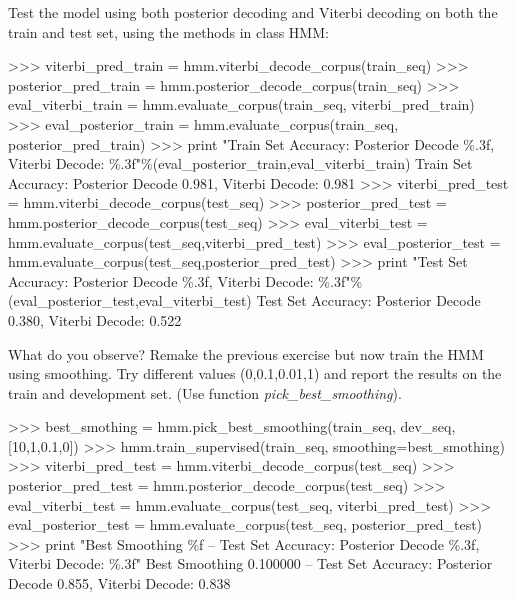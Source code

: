 \begin{exercise}
Test the model using both posterior decoding and Viterbi decoding on
both the train and test set, using the methods in class HMM:
\begin{python}
>>> viterbi_pred_train = hmm.viterbi_decode_corpus(train_seq)
>>> posterior_pred_train = hmm.posterior_decode_corpus(train_seq)
>>> eval_viterbi_train =   hmm.evaluate_corpus(train_seq, viterbi_pred_train)
>>> eval_posterior_train =  hmm.evaluate_corpus(train_seq, posterior_pred_train)
>>> print "Train Set Accuracy: Posterior Decode \%.3f, Viterbi Decode: \%.3f"\%(eval_posterior_train,eval_viterbi_train)
Train Set Accuracy: Posterior Decode 0.981, Viterbi Decode: 0.981
>>> viterbi_pred_test = hmm.viterbi_decode_corpus(test_seq)
>>> posterior_pred_test = hmm.posterior_decode_corpus(test_seq)
>>> eval_viterbi_test =   hmm.evaluate_corpus(test_seq,viterbi_pred_test)
>>> eval_posterior_test = hmm.evaluate_corpus(test_seq,posterior_pred_test)
>>> print "Test Set Accuracy: Posterior Decode \%.3f, Viterbi Decode: \%.3f"\%(eval_posterior_test,eval_viterbi_test)
Test Set Accuracy: Posterior Decode 0.380, Viterbi Decode: 0.522
\end{python}

What do you observe? Remake the previous exercise but now train the HMM
using smoothing. Try different values (0,0.1,0.01,1) and report the results on the
train and development set. (Use function
\emph{pick\_best\_smoothing}).


\begin{python}
>>> best_smothing = hmm.pick_best_smoothing(train_seq, dev_seq, [10,1,0.1,0])
>>> hmm.train_supervised(train_seq, smoothing=best_smothing)
>>> viterbi_pred_test = hmm.viterbi_decode_corpus(test_seq)
>>> posterior_pred_test = hmm.posterior_decode_corpus(test_seq)
>>> eval_viterbi_test =   hmm.evaluate_corpus(test_seq, viterbi_pred_test)
>>> eval_posterior_test = hmm.evaluate_corpus(test_seq, posterior_pred_test)
>>> print "Best Smoothing \%f --  Test Set Accuracy: Posterior Decode \%.3f, Viterbi Decode: \%.3f"%
Best Smoothing 0.100000 --  Test Set Accuracy: Posterior Decode 0.855, Viterbi Decode: 0.838
\end{python}

%


\end{exercise}
